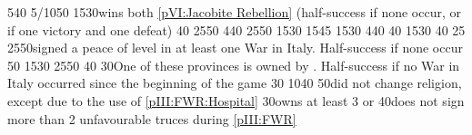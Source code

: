 %
%
{5}{40}{}%
%
%
%
{5/10}{50}{}%
%
%
{15}{30}{\paysmajeurAngleterre wins both \ref{pVI:Jacobite Rebellion}
  (half-success if none occur, or if one victory and one defeat)}%
%
%
{}{40}{}%
%
%
{25}{50}{\EU@objWoSS}%
%
%
{4}{40}{\EU@objEastIndiesConvoy}%
%
%
%
{25}{50}{\EU@objIndependanceWars}%
%
%
{15}{30}{\EU@objFranceContained}%
%
%
{15}{45}{\EU@objEachCC}%
%
%
{15}{30}{\EU@objSYW}
%
%
{4}{40}{\EU@objEastIndiesConvoy}%
%
%
%
 
%
%
{}{40}{\EU@objCalaisFRA}%
%
%
%
{15}{30}{}%
%
%
{}{40}{\EU@objSDCF}%
%
%
{}{25}{\EU@objIndustrial}%
%
%
%
{25}{50}{\paysmajeurFrance signed a peace of level  in at least one War
  in Italy. Half-success if none occur}%
%
%
%
{}{50}{\EU@objCalaisFRA}%
%
%
{15}{30}{}%
%
%
{25}{50}{}%
%
%
{}{40}{\EU@objIndustrial}%
%
%
{}{30}{One of these provinces is owned by \paysmajeurFrance. Half-success if
  no War in Italy occurred since the beginning of the game}%
%
%
%
{}{30}{}%
%
%
%
{10}{40}{}%
%
%
{}{50}{\paysmajeurFrance did not change religion, except due to the use of
  \ref{pIII:FWR:Hospital}}%
%
%
\EUobjective{}{\geq 3 \COL/\TP}{}%
{}{30}{\paysmajeurFrance owns at least 3 \COL or \TP}%
%
%
%
{}{40}{\paysmajeurFrance does not sign more than 2 unfavourable truces during
  \ref{pIII:FWR}}%
